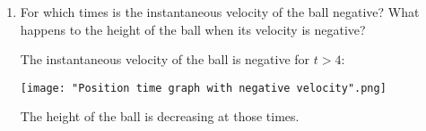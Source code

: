 \documentclass[nooutcomes]{ximera}
\begin{document}
\begin{problem}
\begin{enumerate}
		
		
		\item  For which times is the instantaneous velocity of the ball negative?
      What happens to the height of the ball when its velocity is negative?
      \begin{freeResponse}
        The instantaneous velocity of the ball is negative for $t > 4$:
        \begin{image}
          \texttt{[image: "Position time graph with negative velocity".png]}
        \end{image}
        The height of the ball is decreasing at those times.
      \end{freeResponse}
			
		\end{enumerate}
			
\end{problem}
	
								
				
\end{document}
